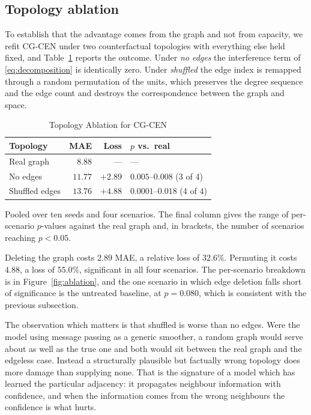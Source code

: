 \documentclass[journal]{IEEEtran}
\newcommand{\CGCEN}{CG\mbox{-}CEN}
\begin{document}
\subsection{Topology ablation}

To establish that the advantage comes from the graph and not from capacity, we
refit \CGCEN{} under two counterfactual topologies with everything else held
fixed, and Table~\ref{tab:ablation} reports the outcome. Under \emph{no edges}
the interference term of \eqref{eq:decomposition} is identically zero. Under \emph{shuffled} the edge index is remapped through a
random permutation of the units, which preserves the degree sequence and the
edge count and destroys the correspondence between the graph and space.

\begin{table}[!t]
\renewcommand{\arraystretch}{1.2}
\caption{Topology Ablation for \CGCEN{}}
\label{tab:ablation}
\centering
\setlength{\tabcolsep}{4pt}
\begin{tabular}{lrrl}
\toprule
\textbf{Topology} & \textbf{MAE} & \textbf{Loss} & \textbf{$p$ vs.\ real} \\
\midrule
Real graph      & $8.88$  & ---     & --- \\
No edges        & $11.77$ & $+2.89$ & $0.005$--$0.008$ (3 of 4) \\
Shuffled edges  & $13.76$ & $+4.88$ & $0.0001$--$0.018$ (4 of 4) \\
\bottomrule
\end{tabular}

\vspace{2pt}
\begin{minipage}{\columnwidth}
\footnotesize Pooled over ten seeds and four scenarios. The final column gives
the range of per-scenario $p$-values against the real graph and, in brackets,
the number of scenarios reaching $p<0.05$.
\end{minipage}
\end{table}

Deleting the graph costs $2.89$ MAE, a relative loss of $32.6\%$. Permuting it
costs $4.88$, a loss of $55.0\%$, significant in all four scenarios. The
per-scenario breakdown is in Figure~\ref{fig:ablation}, and the one scenario in
which edge deletion falls short of significance is the untreated baseline, at
$p = 0.080$, which is consistent with the previous subsection.

The observation which matters is that shuffled is worse than no edges. Were the
model using message passing as a generic smoother, a random graph would serve
about as well as the true one and both would sit between the real graph and the
edgeless case. Instead a structurally plausible but factually wrong topology
does more damage than supplying none. That is the signature of a model which has
learned the particular adjacency: it propagates neighbour information with
confidence, and when the information comes from the wrong neighbours the
confidence is what hurts.
\end{document}
